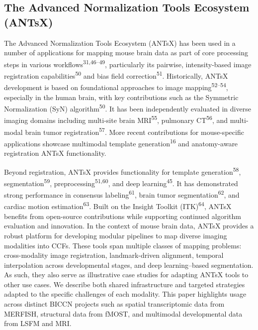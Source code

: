 \documentclass[
  12pt,
]{article}
\begin{document}
\subsection{The Advanced Normalization Tools Ecosystem
(ANTsX)}\label{the-advanced-normalization-tools-ecosystem-antsx}

The Advanced Normalization Tools Ecosystem (ANTsX) has been used in a
number of applications for mapping mouse brain data as part of core
processing steps in various workflows\textsuperscript{31,46--49},
particularly its pairwise, intensity-based image registration
capabilities\textsuperscript{50} and bias field
correction\textsuperscript{51}. Historically, ANTsX development is based
on foundational approaches to image mapping\textsuperscript{52--54},
especially in the human brain, with key contributions such as the
Symmetric Normalization (SyN) algorithm\textsuperscript{50}. It has been
independently evaluated in diverse imaging domains including multi-site
brain MRI\textsuperscript{55}, pulmonary CT\textsuperscript{56}, and
multi-modal brain tumor registration\textsuperscript{57}. More recent
contributions for mouse-specific applications showcase multimodal
template generation\textsuperscript{16} and anatomy-aware registration
ANTsX functionality.

Beyond registration, ANTsX provides functionality for template
generation\textsuperscript{58}, segmentation\textsuperscript{59},
preprocessing\textsuperscript{51,60}, and deep
learning\textsuperscript{45}. It has demonstrated strong performance in
consensus labeling\textsuperscript{61}, brain tumor
segmentation\textsuperscript{62}, and cardiac motion
estimation\textsuperscript{63}. Built on the Insight Toolkit
(ITK)\textsuperscript{64}, ANTsX benefits from open-source contributions
while supporting continued algorithm evaluation and innovation. In the
context of mouse brain data, ANTsX provides a robust platform for
developing modular pipelines to map diverse imaging modalities into
CCFs. These tools span multiple classes of mapping problems:
cross-modality image registration, landmark-driven alignment, temporal
interpolation across developmental stages, and deep learning--based
segmentation. As such, they also serve as illustrative case studies for
adapting ANTsX tools to other use cases. We describe both shared
infrastructure and targeted strategies adapted to the specific
challenges of each modality. This paper highlights usage across distinct
BICCN projects such as spatial transcriptomic data from MERFISH,
structural data from fMOST, and multimodal developmental data from LSFM
and MRI.
\end{document}
